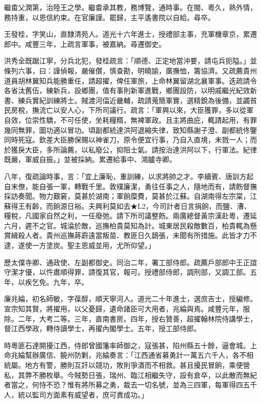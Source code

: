 \begin{pinyinscope}
繼畬父潤第，治陸王之學。繼畬承其教，務博覽，通時事。在閩、粵久，熟外情，務持重，以恩信約束。在官廉謹。罷歸，主平遙書院以自給。尋卒。

王發桂，字笑山，直隸清苑人。道光十六年進士，授禮部主事，充軍機章京，累遷郎中。咸豐三年，上疏言軍事，被嘉納。尋遷御史。

洪秀全既踞江寧，分兵北犯，發桂疏言：「順德、正定地當沖要，請屯兵扼隘。」並條列六事，曰：謹偵報，嚴催儹，慎查勘，明曉諭，廣撫恤，籌協濟。又疏薦貴州道員胡林翼知兵能勝重任，請超擢，俾任軍旅，上命林翼留湖北襄軍事。迭疏請令各省汰舊伍，練新兵，設鄉團，值有事則新軍進戰，鄉團設防，以明戚繼光紀效新書、練兵實紀訓練將士。賊渡河偪近畿輔，疏請蒐簡軍實，選精銳為後備，並蠲貧民房稅，撫流亡以安人心，下所司議行。疏言：「軍興以來，大臣獲罪，多以從軍自效，位崇性驕，不可任使，坐耗糧糈，無裨軍政。且主將曲庇，輒請起用，有罪幾同無罪，圖功適以冒功。頃副都統達洪阿退縮失律，致知縣謝子澄、副都統佟鑒同時死寇。欽差大臣勝保賜以神雀刀，原令便宜行事，乃自入直境，未戮一人；而於獲戾大臣，多所論薦，以私廢公，抑阻士氣。請按治達洪阿以下，行軍法。紀律既嚴，軍威自振。」並被採納。累遷給事中、鴻臚寺卿。

八年，復疏論時事，言：「宜上廉恥，重訓練，以求將帥之才。李續賓、唐訓方起自末僚，能自張一軍，轉戰千里。敦樸廉潔，勇往任事之人，隨地而有，請飭督撫採訪奏聞。物力艱窘，莫甚於湖南；軍餉糜費，莫甚於江蘇。自湖南得左宗棠，江蘇得王有齡，而餉源日裕。夫興利莫如去★L2，今司計者日言捐餉，而鹽、漕、糧稅，凡國家自然之利，一任廢弛。請下所司議整飭。兩廣總督黃宗漢赴粵，遷延六月，遲不之官。城淪於敵，巡撫柏貴莫知為計。城東居民殺敵數百，柏貴輒為懸賞緝殺人者。貴州巡撫蔣霨遠當叛苗、教匪日久鴟張，未聞有所措施。此皆才力不逮，遂使一方塗炭。聖主恩威並用，尤所仰望。」

歷太僕寺卿、通政使、左副都御史。同治二年，署工部侍郎。疏薦戶部郎中王正誼守潔才優，以忤肅順得罪，請復其官，報可。授禮部侍郎，調刑部，又調工部。五年，以疾乞免。九年，卒。

廉兆綸，初名師敏，字葆醇，順天寧河人。道光二十年進士，選庶吉士，授編修。宣宗知其賢，將擢用，以父憂歸，遺命諸臣可大用者，兆綸與焉。咸豐元年，服除。二年，大考二等。三年，直南書房。四年，授右贊善，超擢翰林院侍講學士，督江西學政，轉侍讀學士，再擢內閣學士。五年，授工部侍郎。

時粵匪石達開擾江西，侍郎曾國籓率師御之，寇張甚，陷州縣五十餘，逼會城。上命兆綸幫辦廣信、饒州防剿，兆綸奏言：「江西通省募勇計一萬五六千人，各不相統屬。地方有警，勝則互訐以競功，敗則爭潰而不相救。甚且擾民冒餉，乘便營私，其弊不勝枚舉。今賊勢日張，瑞州、臨江相繼失守，設有倉卒，以此散而無紀者當之，何恃不恐？惟有將所募之勇，裁去一切名號，並為三四軍，每軍得四五千人，統以監司方面素有威望者，庶可責成功。」


\end{pinyinscope}
